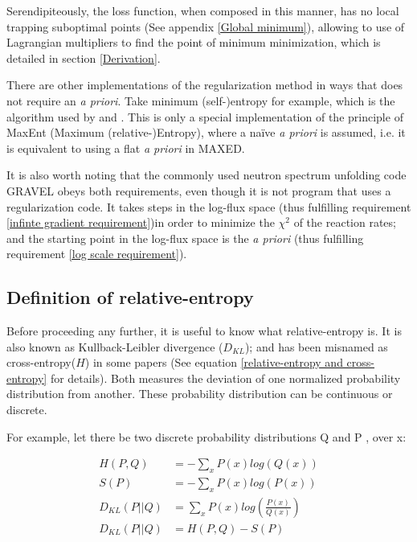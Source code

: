 \documentclass[a4paper, 12pt]{article}
\newcommand{\apriori}[0]{\textit{a priori} }
\begin{document}
    Serendipiteously, the loss function, when composed in this manner, has no local trapping suboptimal points (See appendix \ref{Global minimum}), allowing to use of Lagrangian multipliers to find the point of minimum minimization, which is detailed in section \ref{Derivation}.

    There are other implementations of the regularization method in ways that does not require an \textit{a priori}. Take minimum (self-)entropy for example, which is the algorithm used by \cite{cvachovec2008maximum} and \cite{maeda2013new}. This is only a special implementation of the principle of MaxEnt (Maximum (relative-)Entropy), where a na\"{i}ve \apriori is assumed, i.e. it is equivalent to using a flat \apriori in MAXED.

    It is also worth noting that the commonly used neutron spectrum unfolding code GRAVEL obeys both requirements, even though it is not program that uses a regularization code. It takes steps in the log-flux space (thus fulfilling requirement \ref{infinte gradient requirement})in order to minimize the $\chi^2$ of the reaction rates; and the starting point in the log-flux space is the \apriori(thus fulfilling requirement \ref{log scale requirement}).

\subsection{Definition of relative-entropy}
    Before proceeding any further, it is useful to know what relative-entropy is. It is also known as Kullback-Leibler divergence ($D_{KL}$); and has been misnamed as cross-entropy($H$) in some papers\cite{MAXED1998Reginatto} (See equation \ref{relative-entropy and cross-entropy} for details). Both measures the deviation of one normalized probability distribution from another. These probability distribution can be continuous or discrete.

    For example, let there be two discrete probability distributions Q and P , over x:

    \begin{align}
    H(P,Q)    &=  - \sum_x P(x) log(Q(x))   \\
    S(P)      &=  - \sum_x P(x) log(P(x))   \\
    D_{KL}(P||Q) &= \sum_x P(x)log(\frac{P(x)}{Q(x)}) \label{relative-entropy definition}\\
    D_{KL}(P||Q) &= H(P,Q)-S(P) \label{relative-entropy and cross-entropy}
    \end{align}
\end{document}
